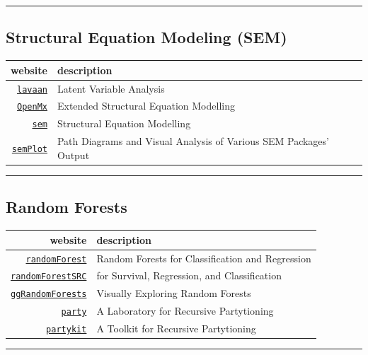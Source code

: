 \documentclass[]{book}
\theoremstyle{definition}
\theoremstyle{definition}
\theoremstyle{definition}
\theoremstyle{remark}
\begin{document}
\begin{center}\rule{0.5\linewidth}{\linethickness}\end{center}

\subsection{Structural Equation Modeling
(SEM)}\label{structural-equation-modeling-sem}

\begin{longtable}[]{@{}rl@{}}
\toprule
website & description\tabularnewline
\midrule
\endhead
\href{http://lavaan.org}{\texttt{lavaan}} & Latent Variable
Analysis\tabularnewline
\href{https://openmx.ssri.psu.edu/}{\texttt{OpenMx}} & Extended
Structural Equation Modelling\tabularnewline
\href{https://www.methodsconsultants.com/tutorial/structural-equation-models-using-the-sem-package-in-r/}{\texttt{sem}}
& Structural Equation Modelling\tabularnewline
\href{http://sachaepskamp.com/semPlot/examples}{\texttt{semPlot}} & Path
Diagrams and Visual Analysis of Various SEM Packages'
Output\tabularnewline
\bottomrule
\end{longtable}

\begin{center}\rule{0.5\linewidth}{\linethickness}\end{center}

\subsection{Random Forests}\label{random-forests}

\begin{longtable}[]{@{}rl@{}}
\toprule
website & description\tabularnewline
\midrule
\endhead
\href{https://www.guru99.com/r-random-forest-tutorial.html}{\texttt{randomForest}}
& Random Forests for Classification and Regression\tabularnewline
\href{http://www.riptutorial.com/r/example/13086/random-forest-survival-analysis-with-randomforestsrc}{\texttt{randomForestSRC}}
& for Survival, Regression, and Classification\tabularnewline
\href{https://arxiv.org/pdf/1612.08974.pdf}{\texttt{ggRandomForests}} &
Visually Exploring Random Forests\tabularnewline
\href{http://party.r-forge.r-project.org/}{\texttt{party}} & A
Laboratory for Recursive Partytioning\tabularnewline
\href{}{\texttt{partykit}} & A Toolkit for Recursive
Partytioning\tabularnewline
\bottomrule
\end{longtable}

\begin{center}\rule{0.5\linewidth}{\linethickness}\end{center}
\end{document}
